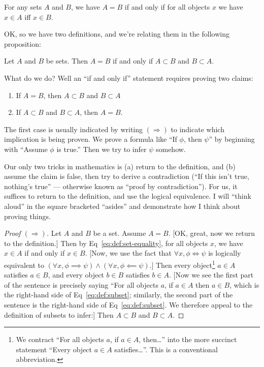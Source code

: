 \begin{axiom}[Extensionality]
For any sets $A$ and $B$, we have $A=B$ if and only if for all objects
$x$ we have $x\in A$ iff $x\in B$.
\end{axiom}

OK, so we have two definitions, and we're relating them in the following
proposition:

\begin{proposition}\label{prop:subsets:equiv-set-equality}
Let $A$ and $B$ be sets.
Then $A=B$ if and only if $A\subset B$ and $B\subset A$.
\end{proposition}

What do we do? Well an ``if and only if'' statement requires proving two
claims:
\begin{enumerate}
\item If $A=B$, then $A\subset B$ and $B\subset A$
\item If $A\subset B$ and $B\subset A$, then $A=B$.
\end{enumerate}
The first case is usually indicated by writing $(\Longrightarrow)$ to
indicate which implication is being proven. We prove a formula like ``If
$\phi$, then $\psi$'' by beginning with ``Assume $\phi$ is true.'' Then
we try to infer $\psi$ somehow.

Our only two tricks in mathematics is (a) return to the definition, and
(b) assume the claim is false, then try to derive a contradiction (``If
this isn't true, nothing's true'' --- otherwise known as ``proof by
contradiction''). For us, it suffices to return to the definition, and
use the logical equivalence. I will ``think aloud'' in the square
bracketed ``asides'' and demonstrate how I think about proving things.

\begin{proof}[Proof $(\Longrightarrow)$]
Let $A$ and $B$ be a set. Assume $A=B$. [OK, great, now we return to the
definition.] Then by Eq~\eqref{eq:def:set-equality}, for all objects
$x$, we have $x\in A$ if and only if $x\in B$. [Now, we use the fact
that $\forall x,\phi\iff\psi$ is logically equivalent to
$(\forall x,\phi\implies\psi)\land(\forall x,\phi\impliedby\psi)$.]
Then every object\footnote{We contract ``For all objects $a$, if $a\in A$, then\dots''
into the more succinct statement ``Every object $a\in A$ satisfies\dots''.
This is a conventional abbreviation.}
$a\in A$ satisfies $a\in B$, and every object $b\in B$
satisfies $b\in A$. [Now we see the first part of the sentence is
  precisely saying ``For all objects $a$, if $a\in A$ then $a\in B$, 
which is the right-hand side of Eq~\eqref{eq:def:subset}; similarly, the
second part of the sentence is the right-hand side of
Eq~\eqref{eq:def:subset}. We therefore appeal to the definition of
subsets to infer:]
Then $A\subset B$ and $B\subset A$.
\end{proof}


